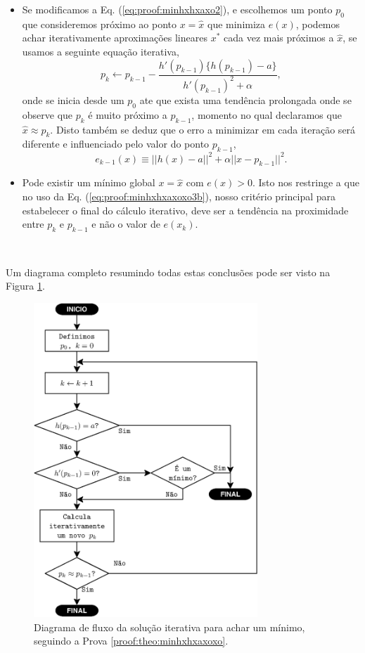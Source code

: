 \begin{myproofT}
\begin{itemize}
\item Se modificamos a Eq. (\ref{eq:proof:minhxhxaxo2}), e escolhemos um ponto  
$p_0$ que consideremos próximo ao ponto $x=\hat{x}$ que minimiza $e(x)$,
podemos achar iterativamente aproximações lineares $x^*$ cada vez mais próximos a  $\hat{x}$,
se usamos a seguinte equação iterativa,
\begin{equation}\label{eq:proof:minhxhxaxoxo3b}
p_{k} \leftarrow p_{k-1} - \frac{h'(p_{k-1})\{h(p_{k-1})-a\}}{h'(p_{k-1})^2 +\alpha},
\end{equation}
onde se inicia desde um $p_{0}$ 
ate que exista uma tendência prolongada onde se observe que $p_{k}$ é muito próximo a $p_{k-1}$,
momento no qual declaramos que $\hat{x} \approx p_{k}$.
Disto também se deduz que o erro a minimizar em cada iteração será diferente e influenciado pelo valor do ponto $p_{k-1}$,
\begin{equation}
e_{k-1}(x)  \equiv ||h(x)-a||^2+\alpha||x-p_{k-1}||^2.
\end{equation}
\item Pode existir um mínimo global $x=\hat{x}$ com $e(x) > 0$.
Isto nos restringe a que no uso da Eq. (\ref{eq:proof:minhxhxaxoxo3b}),
nosso critério principal para estabelecer o final do cálculo iterativo,
deve ser a tendência na  proximidade entre $p_{k}$ e $p_{k-1}$ 
e não o valor de $e(x_k)$.
\end{itemize}~

Um diagrama completo resumindo todas estas conclusões pode ser visto na Figura \ref{fig:fluxohx3}.
\end{myproofT}
\begin{figure}[!h]
     \centering
         \includegraphics[width=0.75\textwidth]{chapters/minimization-hx/fluxo3.eps}
        \caption{Diagrama de fluxo da solução iterativa para achar um mínimo, seguindo a Prova \ref{proof:theo:minhxhxaxoxo}.}
        \label{fig:fluxohx3}
\end{figure}
